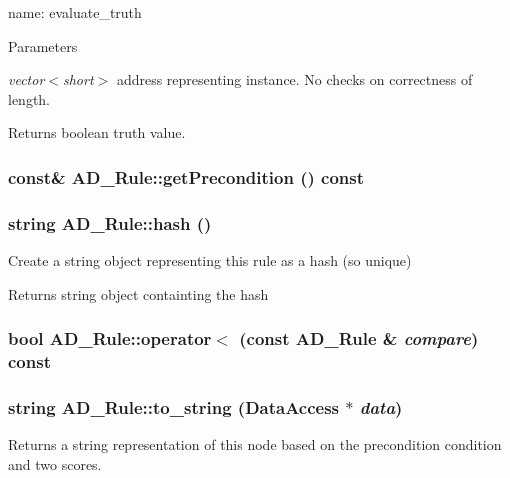 name: evaluate\_\-truth 
\begin{DoxyParams}{Parameters}
\item[{\em vector$<$short$>$}]address representing instance. No checks on correctness of length. \end{DoxyParams}
\begin{DoxyReturn}{Returns}
boolean truth value. 
\end{DoxyReturn}
\hypertarget{classAD__Rule_a60ab01b6d2aec0a056e5944b95fb90c1}{
\subsubsection[{getPrecondition}]{ const\& AD\_\-Rule::getPrecondition () const}}
\label{classAD__Rule_a60ab01b6d2aec0a056e5944b95fb90c1}
\hypertarget{classAD__Rule_a8edfd345e2273fbb087dd51f4a0222d3}{
\subsubsection[{hash}]{\setlength{\rightskip}{0pt plus 5cm}string AD\_\-Rule::hash ()}}
\label{classAD__Rule_a8edfd345e2273fbb087dd51f4a0222d3}
Create a string object representing this rule as a hash (so unique)

\begin{DoxyReturn}{Returns}
string object containting the hash 
\end{DoxyReturn}
\hypertarget{classAD__Rule_afe7504476cbb28eba8c5473633082de2}{
\subsubsection[{operator$<$}]{\setlength{\rightskip}{0pt plus 5cm}bool AD\_\-Rule::operator$<$ (const {\bf AD\_\-Rule} \& {\em compare}) const}}
\label{classAD__Rule_afe7504476cbb28eba8c5473633082de2}
\hypertarget{classAD__Rule_a6f89690e779ccd53468fed8f04e4bf63}{
\subsubsection[{to\_\-string}]{\setlength{\rightskip}{0pt plus 5cm}string AD\_\-Rule::to\_\-string ({\bf DataAccess} $\ast$ {\em data})}}
\label{classAD__Rule_a6f89690e779ccd53468fed8f04e4bf63}
Returns a string representation of this node based on the precondition condition and two scores.

